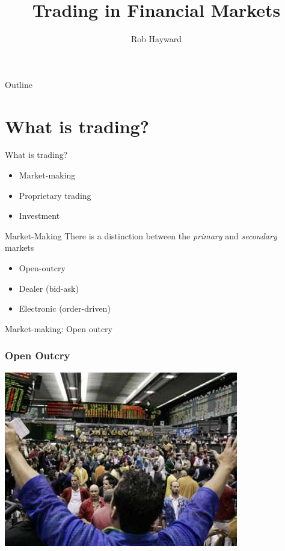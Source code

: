 \documentclass[14pt,xcolor=pdftex,dvipsnames,table]{beamer}\usepackage[]{graphicx}\usepackage[]{color}
\title{Trading in Financial Markets}
\author{Rob Hayward}
\begin{document}
\begin{frame}
\titlepage
\end{frame}

\begin{frame}{Outline}
\tableofcontents
\end{frame}


\section{What is trading?}
\begin{frame}{What is trading?}
\begin{itemize}
\item Market-making
\item Proprietary trading
\item Investment 
\end{itemize}
\end{frame}

\begin{frame}{Market-Making}
There is a distinction between the \emph{primary} and \emph{secondary} markets
\pause
\begin{itemize}[<+-| alert@+>]
\item Open-outcry
\item Dealer (bid-ask)
\item Electronic (order-driven)
\end{itemize}
\end{frame}


\begin{frame}{Market-making: Open outcry}
\frametitle{Open Outcry}
\begin{center}
\includegraphics[height = 3.0in]{Open-Out-Cry}
\end{center}
\end{frame}
\end{document}
